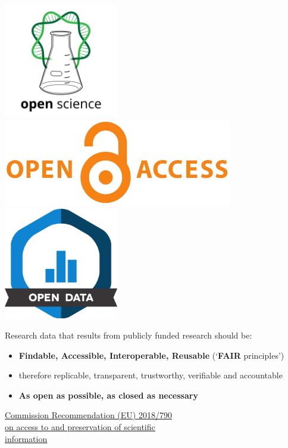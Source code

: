\documentclass[a0,portrait]{a0poster}
\begin{document}
\begin{multicols}{3}
 \includegraphics[width=5cm]{Poster TEX/style/Open Science.png} 
 \hspace{\fill} 
 \includegraphics[width=10cm]{Poster TEX/style/Open access (4).png}
 \hspace{\fill} 
 \includegraphics[width=5cm]{Poster TEX/style/Open data.png}

Research data that results from publicly funded research should be:

\begin{itemize}
\item \textbf{Findable, Accessible, Interoperable, Reusable} (‘\textbf{FAIR} principles’) \cite{2022_EUA}
\item therefore replicable, transparent, trustworthy, verifiable and accountable
\item \textbf{As open as possible, as closed as necessary}
\end{itemize}
\color{black}

\href{https://eur-lex.europa.eu/legal-content/EN/TXT/?uri=CELEX%3A32018H0790&qid=1701691098601}{\color{blue}\underline{Commission Recommendation (EU) 2018/790}} \\
\href{https://eur-lex.europa.eu/legal-content/EN/TXT/?uri=CELEX%3A32018H0790&qid=1701691098601}{\color{blue}\underline{on access to and preservation of scientific}} \\
\href{https://eur-lex.europa.eu/legal-content/EN/TXT/?uri=CELEX%3A32018H0790&qid=1701691098601}{\color{blue}\underline{information}}


\end{multicols}
\end{document}
